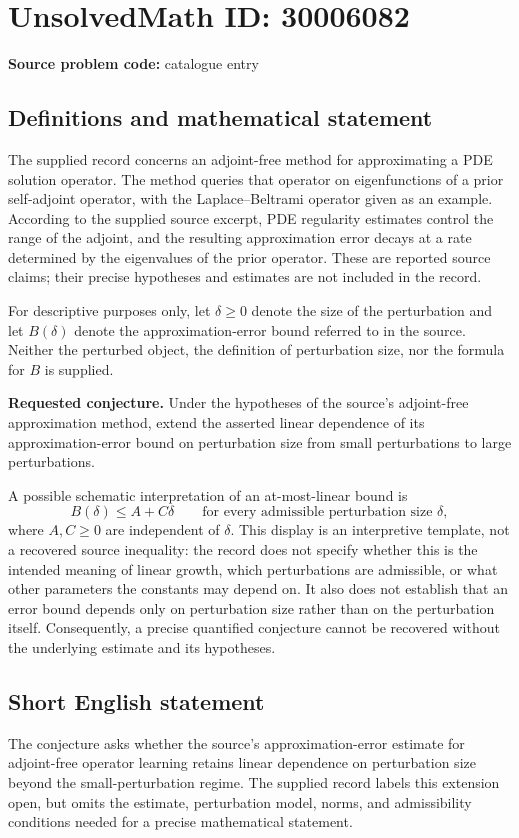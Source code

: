 \documentclass[11pt]{article}
\begin{document}
\section*{UnsolvedMath ID: 30006082}
\textbf{Source problem code:} catalogue entry
\subsection{Definitions and mathematical statement}
The supplied record concerns an adjoint-free method for approximating a PDE solution operator. The method queries that operator on eigenfunctions of a prior self-adjoint operator, with the Laplace--Beltrami operator given as an example. According to the supplied source excerpt, PDE regularity estimates control the range of the adjoint, and the resulting approximation error decays at a rate determined by the eigenvalues of the prior operator. These are reported source claims; their precise hypotheses and estimates are not included in the record.

For descriptive purposes only, let \(\delta\geq 0\) denote the size of the perturbation and let \(B(\delta)\) denote the approximation-error bound referred to in the source. Neither the perturbed object, the definition of perturbation size, nor the formula for \(B\) is supplied.

\textbf{Requested conjecture.} Under the hypotheses of the source's adjoint-free approximation method, extend the asserted linear dependence of its approximation-error bound on perturbation size from small perturbations to large perturbations.

A possible schematic interpretation of an at-most-linear bound is
\[
B(\delta)\leq A+C\delta
\qquad\text{for every admissible perturbation size }\delta,
\]
where \(A,C\geq 0\) are independent of \(\delta\). This display is an interpretive template, not a recovered source inequality: the record does not specify whether this is the intended meaning of linear growth, which perturbations are admissible, or what other parameters the constants may depend on. It also does not establish that an error bound depends only on perturbation size rather than on the perturbation itself. Consequently, a precise quantified conjecture cannot be recovered without the underlying estimate and its hypotheses.
\subsection{Short English statement}
The conjecture asks whether the source's approximation-error estimate for adjoint-free operator learning retains linear dependence on perturbation size beyond the small-perturbation regime. The supplied record labels this extension open, but omits the estimate, perturbation model, norms, and admissibility conditions needed for a precise mathematical statement.
\end{document}

